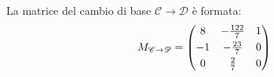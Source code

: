 \documentclass[a4paper]{article}
\makeatletter
\newenvironment{rowequmat}[1]{\left(\array{@{}#1@{}}}{\endarray\right)}
\makeatother
\begin{document}
	La matrice del cambio di base $\mathscr{C} \rightarrow \mathscr{D}$ è formata:
	\begin{equation*}
		M_{\mathscr{C} \rightarrow \mathscr{D}} = \begin{rowequmat}{ccc}
			8  & -\frac{122}{7} & 1 \\ [0.3em]
			-1 & -\frac{23}{7}  & 0 \\ [0.3em]
			0  &  \frac{2}{7}   & 0
		\end{rowequmat}
	\end{equation*}
\end{document}
